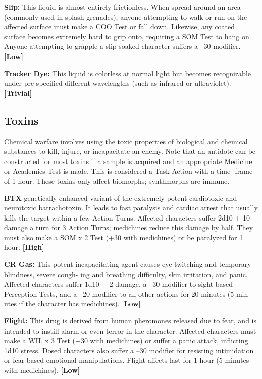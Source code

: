 \textbf{Slip:} This liquid is almost entirely frictionless. When 
spread around an area (commonly used in splash 
grenades), anyone attempting to walk or run on the 
affected surface must make a COO Test or fall down. 
Likewise, any coated surface becomes extremely 
hard to grip onto, requiring a SOM Test to hang on. 
Anyone attempting to grapple a slip-soaked character 
suffers a –30 modifier. \textbf{[Low]}

\textbf{Tracker Dye:} This liquid is colorless at normal light 
but becomes recognizable under pre-specified different 
wavelengths (such as infrared or ultraviolet). \textbf{[Trivial]}

\subsection{Toxins}

Chemical warfare involves using the toxic properties 
of biological and chemical substances to kill, injure, 
or incapacitate an enemy. Note that an antidote can 
be constructed for most toxins if a sample is acquired 
and an appropriate Medicine or Academics Test is 
made. This is considered a Task Action with a time-
frame of 1 hour. These toxins only affect biomorphs; 
synthmorphs are immune.

\textbf{BTX}
genetically-enhanced variant of the extremely potent 
cardiotoxic and neurotoxic batrachotoxin. It leads to 
fast paralysis and cardiac arrest that usually kills the 
target within a few Action Turns. Affected characters 
suffer 2d10 + 10 damage a turn for 3 Action Turns; 
medichines reduce this damage by half. They must 
also make a SOM x 2 Test (+30 with medichines) or 
be paralyzed for 1 hour. \textbf{[High]}

\textbf{CR Gas:} This potent incapacitating agent causes 
eye twitching and temporary blindness, severe cough-
ing and breathing difficulty, skin irritation, and panic. 
Affected characters suffer 1d10 ÷ 2 damage, a –30 
modifier to sight-based Perception Tests, and a –20 
modifier to all other actions for 20 minutes (5 min-
utes if the character has medichines). \textbf{[Low]}

\textbf{Flight:} This drug is derived from human pheromones 
released due to fear, and is intended to instill alarm or 
even terror in the character. Affected characters must 
make a WIL x 3 Test (+30 with medichines) or suffer 
a panic attack, inflicting 1d10 stress. Dosed characters 
also suffer a –30 modifier for resisting intimidation or 
fear-based emotional manipulations. Flight affects last 
for 1 hour (5 minutes with medichines). \textbf{[Low]}

